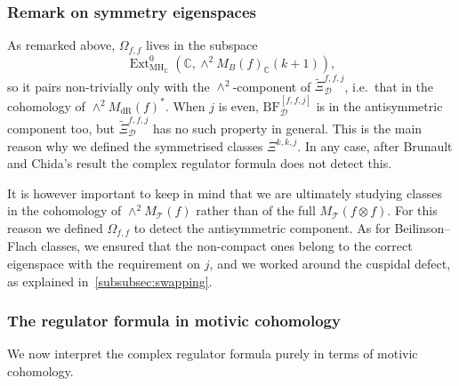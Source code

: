 \documentclass[11pt, a4paper, reqno]{amsart}
\theoremstyle{definition}
\theoremstyle{plain}
\theoremstyle{remark}
\DeclareMathOperator{\Ext}{Ext}
\DeclareMathOperator{\dR}{dR}
\newcommand{\numberset}{\mathbb}
\newcommand{\C}{\numberset{C}}
\newcommand{\theory}{\mathcal{T}}
\newcommand{\BF}{\mathrm{BF}}
\newcommand{\lcBF}{\widetilde{\Xi}}
\newcommand{\cBF}{\Xi}
\newcommand{\MH}{\mathrm{MH}}
\newcommand{\del}{\mathcal{D}}
\begin{document}
\subsubsection{Remark on symmetry eigenspaces}
As remarked above, $\Omega_{f,f}$ lives in the subspace
\[ \Ext^0_{\MH_{\C}}(\C, \wedge^2 M_B(f)_\C(k+1)),\]
so it pairs non-trivially only with the $\wedge^2$-component of $\lcBF^{f,f,j}_{\del}$, i.e.\ that in the cohomology of $\wedge^2 M_{\dR}(f)^*$. When $j$ is even, $\BF^{[f,f,j]}_{\del}$ is in the antisymmetric component too, but $\lcBF^{f,f,j}_{\del}$ has no such property in general. This is the main reason why we defined the symmetrised classes $\cBF^{k,k,j}$. In any case, after Brunault and Chida's result the complex regulator formula does not detect this.

It is however important to keep in mind that we are ultimately studying classes in the cohomology of $\wedge^2 M_{\theory}(f)$ rather than of the full $M_{\theory}(f\otimes f)$. For this reason we defined $\Omega_{f,f}$ to detect the antisymmetric component. As for Beilinson--Flach classes, we ensured that the non-compact ones belong to the correct eigenspace with the requirement on $j$, and we worked around the cuspidal defect, as explained in~\ref{subsubsec:swapping}.

\subsubsection{The regulator formula in motivic cohomology}
\label{subsubsec:regulator-motivic-cohomology}
We now interpret the complex regulator formula purely in terms of motivic cohomology.
\end{document}
